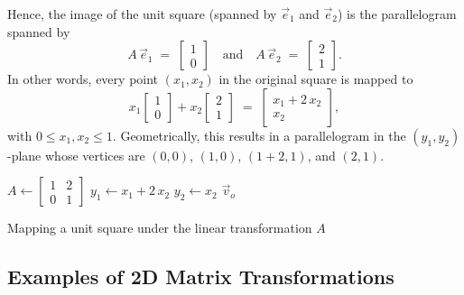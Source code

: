 \documentclass{report}
\begin{document}
Hence, the image of the unit square (spanned by $\vec{e}_1$ and $\vec{e}_2$) is the parallelogram spanned by
\[
	A\,\vec{e}_1 \;=\; \begin{bmatrix}1\\0\end{bmatrix}
	\quad \text{and} \quad
	A\,\vec{e}_2 \;=\; \begin{bmatrix}2\\1\end{bmatrix}.
\]
In other words, every point $(x_1,x_2)$ in the original square is mapped to
\[
	x_1 \begin{bmatrix}1\\0\end{bmatrix}
	+ x_2 \begin{bmatrix}2\\1\end{bmatrix}
	\;=\;
	\begin{bmatrix}
		x_1 + 2\,x_2 \\
		x_2
	\end{bmatrix},
\]
with $0 \le x_1,x_2 \le 1$. Geometrically, this results in a parallelogram in the $(y_1,y_2)$-plane whose vertices are $(0,0)$, $(1,0)$, $(1+2,1)$, and $(2,1)$.


\vspace{1cm}
\begin{algorithm}[H]
	\SetAlgoLined
	\SetNoFillComment
	$A \leftarrow \begin{bmatrix}1 & 2 \\ 0 & 1\end{bmatrix}$\;
	$y_1 \leftarrow x_1 + 2\,x_2$\;
	$y_2 \leftarrow x_2$\;
	\Return $\vec{v}_o$\;
	\caption{Mapping a unit square under the linear transformation $A$}
\end{algorithm}

\subsection{Examples of 2D Matrix Transformations}

\end{document}
